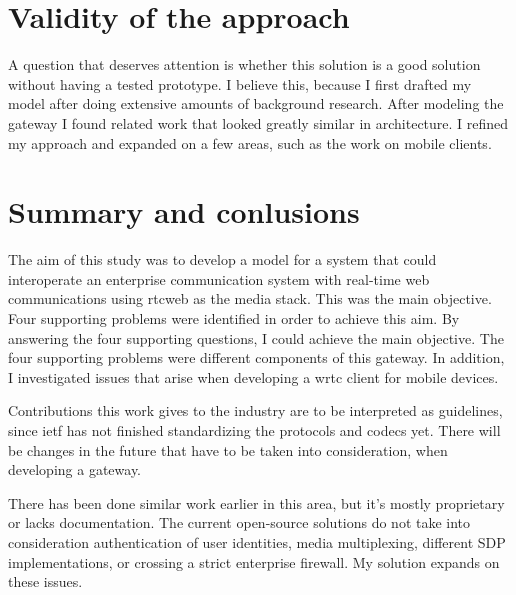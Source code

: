 \section{Validity of the approach}
A question that deserves attention is whether this solution is a good solution without having a tested prototype. I believe this, because I first drafted my model after doing extensive amounts of background research. After modeling the gateway I found related work that looked greatly similar in architecture. I refined my approach and expanded on a few areas, such as the work on mobile clients.

\section{Summary and conlusions}
The aim of this study was to develop a model for a system that could interoperate an enterprise communication system with real-time web communications using \gls{rtcweb} as the media stack. This was the main objective. Four supporting problems were identified in order to achieve this aim. By answering the four supporting questions, I could achieve the main objective. The four supporting problems were different components of this gateway. In addition, I investigated issues that arise when developing a \gls{wrtc} client for mobile devices.

Contributions this work gives to the industry are to be interpreted as guidelines, since \gls{ietf} has not finished standardizing the protocols and codecs yet. There will be changes in the future that have to be taken into consideration, when developing a gateway.

There has been done similar work earlier in this area, but it's mostly proprietary or lacks documentation. The current open-source solutions do not take into consideration authentication of user identities, media multiplexing, different SDP implementations, or crossing a strict enterprise firewall. My solution expands on these issues.

